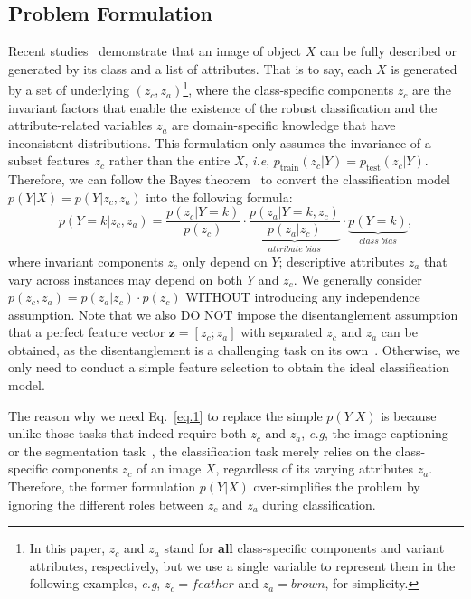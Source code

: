 \documentclass{article}
\def\eg{\emph{e.g}} \def\Eg{\emph{E.g}}
\def\ie{\emph{i.e}} \def\Ie{\emph{I.e}}
\begin{document}
\subsection{Problem Formulation} 



Recent studies~\cite{mirza2014conditional,besserve2018counterfactuals,wang2021self} demonstrate that an image of object $X$ can be fully described or generated by its class and a list of attributes. That is to say, each $X$ is generated by a set of underlying $(z_c, z_a)$\footnote{In this paper, $z_c$ and $z_a$ stand for \textbf{all} class-specific components and variant attributes, respectively, but we use a single variable to represent them in the following examples, \eg, $z_c=feather$ and $z_a=brown$, for simplicity.}, where the class-specific components $z_c$ are the invariant factors that enable the existence of the robust classification and the attribute-related variables $z_a$ are domain-specific knowledge that have inconsistent distributions. This formulation only assumes the invariance of a subset features $z_c$ rather than the entire $X$, \ie, $p_{\text{train}}(z_c|Y) = p_{\text{test}}(z_c|Y)$. Therefore, we can follow the Bayes theorem~\cite{stone2013bayes} to convert the classification model $p(Y|X)=p(Y|z_c,z_a)$ into the following formula: 
\begin{equation}
    \label{eq.1}
    p(Y=k|z_c, z_a) = \frac{p(z_c|Y=k)}{p(z_c)} \cdot \underbrace{\frac{p(z_a|Y=k,z_c)}{p(z_a|z_c)}}_{attribute\;bias} \cdot \underbrace{p(Y=k)}_{class\;bias},
\end{equation}
where invariant components $z_c$ only depend on $Y$; descriptive attributes $z_a$ that vary across instances may depend on both $Y$ and $z_c$. We generally consider $p(z_c, z_a) = p(z_a|z_c)\cdot p(z_c)$ WITHOUT introducing any independence assumption. Note that we also DO NOT impose the disentanglement assumption that a perfect feature vector $\mathbf{z}=[z_c;z_a]$ with separated $z_c$ and $z_a$ can be obtained, as the disentanglement is a challenging task on its own~\cite{locatello2019challenging}. Otherwise, we only need to conduct a simple feature selection to obtain the ideal classification model.

The reason why we need Eq.~\eqref{eq.1} to replace the simple $p(Y|X)$ is because unlike those tasks that indeed require both $z_c$ and $z_a$, \eg, the image captioning~\cite{you2016image} or the segmentation task~\cite{he2017mask}, the classification task merely relies on the class-specific components $z_c$ of an image $X$, regardless of its varying attributes $z_a$.  Therefore, the former formulation $p(Y|X)$ over-simplifies the problem by ignoring the different roles between $z_c$ and $z_a$ during classification. 
\end{document}
